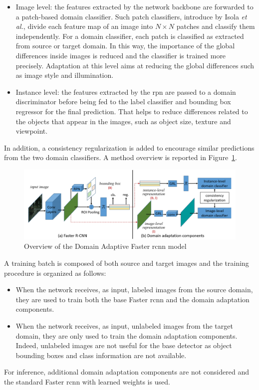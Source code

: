 \documentclass[%
    corpo=12pt,
    twoside,
    stile=classica,   
    tipotesi=magistrale,
    evenboxes,
    english,
	numerazioneromana,
]{toptesi}
\begin{document}
\begin{itemize}
	\item Image level: the features extracted by the network backbone are forwarded to a patch-based domain classifier. Such patch classifiers, introduce by Isola \textit{et al.}\cite{isola2018imagetoimage}, divide each feature map of an image into $ N\times N $ patches and classify them independently. For a domain classifier, each patch is classified as extracted from source or target domain. In this way, the importance of the global differences inside images is reduced and the classifier is trained more precisely. Adaptation at this level aims at reducing the global differences such as image style and illumination.
	\item Instance level: the features extracted by the \gls{rpn} are passed to a domain discriminator before being fed to the label classifier and bounding box regressor for the final prediction. That helps to reduce differences related to the objects that appear in the images, such as object size, texture and viewpoint.
\end{itemize}
In addition, a consistency regularization is added to encourage similar predictions from the two domain classifiers. A method overview is reported in Figure~\ref{fig:dafasterrcnn}.

\begin{figure}[ht]
	\centering
	\includegraphics[width=\linewidth]{imgs/dafasterrcnn.png}
	\caption{Overview of the Domain Adaptive Faster \gls{rcnn} model\cite{chen2018domain}}
	\label{fig:dafasterrcnn}
\end{figure}

\bigskip
A training batch is composed of both source and target images and the training procedure is organized as follows:
\begin{itemize}
	\item When the network receives, as input, labeled images from the source domain, they are used to train both the base Faster \gls{rcnn} and the domain adaptation components.
	\item When the network receives, as input, unlabeled images from the target domain, they are only used to train the domain adaptation components. Indeed, unlabeled images are not useful for the base detector as object bounding boxes and class information are not available.
\end{itemize}
For inference, additional domain adaptation components are not considered and the standard Faster \gls{rcnn} with learned weights is used.
\end{document}
